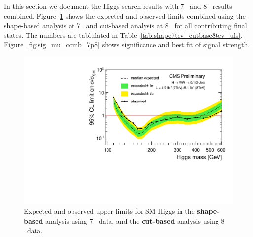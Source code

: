In this section we document the Higgs search results with 7 \TeV\ and 8 \TeV\ results combined. 
Figure~\ref{fig:uls_cut_finalcomb} shows the expected and observed limits combined using the shape-based analysis 
at 7 \TeV\ and cut-based analysis at 8 \TeV\ for all contributing final states. 
The numbers are tablulated in Table~\ref{tab:shape7tev_cutbase8tev_uls}.  
Figure~\ref{fig:sig_mu_comb_7p8} shows significance and best fit of signal strength.

\begin{figure}[!hbtp]
\centering
\includegraphics[width=.75\textwidth]{figures/limits_nj_shape7TeV_cut8TeV-CLs-asymptotic_log.pdf}
\caption{Expected and observed upper limits for SM Higgs in the
{\bf shape-based} analysis using 7 \TeV\ data, and the {\bf cut-based} analysis using 8 \TeV\ data. }
\label{fig:uls_cut_finalcomb}
\end{figure}

